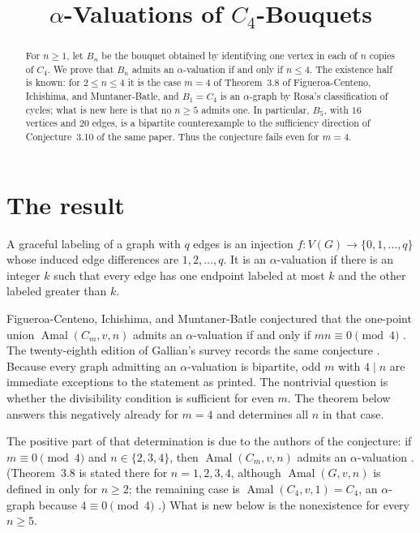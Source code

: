 \documentclass[11pt]{amsart}
\title[$\alpha$-valuations of $C_4$-bouquets]
  {$\alpha$-Valuations of $C_4$-Bouquets}
\date{}
\DeclareMathOperator{\Amal}{Amal}
\begin{document}
\begin{abstract}
For $n\ge1$, let $B_n$ be the bouquet obtained by identifying one vertex
in each of $n$ copies of $C_4$. We prove that $B_n$ admits an
$\alpha$-valuation if and only if $n\le4$. The existence half is known:
for $2\le n\le4$ it is the case $m=4$ of Theorem~3.8 of
Figueroa-Centeno, Ichishima, and Muntaner-Batle, and $B_1=C_4$ is an
$\alpha$-graph by Rosa's classification of cycles; what is new here is
that no $n\ge5$ admits one. In particular, $B_5$, with $16$ vertices and
$20$ edges, is a bipartite counterexample to the sufficiency direction of
Conjecture~3.10 of the same paper. Thus the conjecture fails even for
$m=4$.
\end{abstract}

\maketitle

\section{The result}

A graceful labeling of a graph with $q$ edges is an injection
$f\colon V(G)\to\{0,1,\dots,q\}$ whose induced edge differences are
$1,2,\dots,q$. It is an $\alpha$-valuation if there is an integer $k$
such that every edge has one endpoint labeled at most $k$ and the other
labeled greater than $k$.

Figueroa-Centeno, Ichishima, and Muntaner-Batle conjectured that the
one-point union $\Amal(C_m,v,n)$ admits an $\alpha$-valuation if and only
if $mn\equiv0\pmod4$ \cite[Conjecture~3.10]{FCIM}. The twenty-eighth
edition of Gallian's survey records the same conjecture
\cite[p.~53]{Gallian}. Because every graph admitting an
$\alpha$-valuation is bipartite, odd $m$ with $4\mid n$ are immediate
exceptions to the statement as printed. The nontrivial question is
whether the divisibility condition is sufficient for even $m$. The
theorem below answers this negatively already for $m=4$ and determines
all $n$ in that case.

The positive part of that determination is due to the authors of the
conjecture: if $m\equiv0\pmod4$ and $n\in\{2,3,4\}$, then
$\Amal(C_m,v,n)$ admits an $\alpha$-valuation
\cite[Theorem~3.8]{FCIM}. (Theorem~3.8 is stated there for
$n=1,2,3,4$, although $\Amal(G,v,n)$ is defined in \cite{FCIM} only for
$n\ge2$; the remaining case is $\Amal(C_4,v,1)=C_4$, an $\alpha$-graph
because $4\equiv0\pmod4$ \cite{Rosa}.) What is new below is the
nonexistence for every $n\ge5$.
\end{document}
